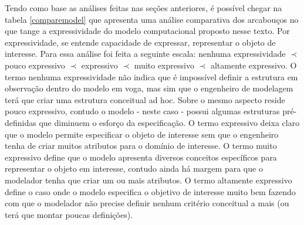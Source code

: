Tendo como base as análises feitas nas seções anteriores, é possível chegar na tabela \ref{comparemodel} que apresenta uma análise comparativa dos arcabouços no que tange a expressividade do modelo computacional proposto nesse texto. Por expressividade, se entende capacidade de expressar, representar o objeto de interesse. Para essa análise 
foi feita a seguinte escala: nenhuma expressividade $\prec$ pouco expressivo $\prec$ expressivo $\prec$ muito expressivo $\prec$ altamente expressivo. O termo nenhuma expressividade não indica que é impossível definir a estrutura em observação dentro do modelo em voga, mas sim que o engenheiro de modelagem terá que criar uma estrutura conceitual ad hoc. Sobre o mesmo aspecto reside pouco expressivo, contudo o modelo - neste caso - possui algumas estruturas pré-definidas que diminuem o esforço da especificação. O termo expressivo deixa claro que o modelo permite especificar o objeto de interesse sem que o engenheiro tenha de criar muitos atributos para o domínio de interesse. O termo muito expressivo define que o modelo apresenta diversos conceitos específicos para representar o objeto em interesse, contudo ainda há margem para que o modelador tenha que criar um ou mais atributos. O termo altamente expressivo define o caso onde o modelo especifica o objetivo de interesse muito bem fazendo com que o modelador não precise definir nenhum critério conceitual a mais (ou terá que montar poucas definições).   

